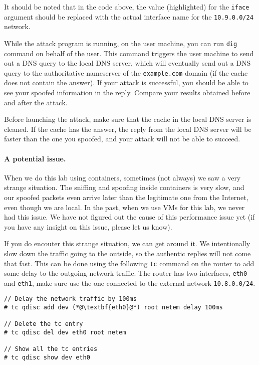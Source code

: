 It should be noted that in the code above, the value (highlighted) for the 
\texttt{iface} argument should be replaced with the actual interface 
name for the \texttt{10.9.0.0/24} network.  
 
While the attack program is running, on the user machine, you can
run \texttt{dig} command on behalf of the user.
This command triggers the user
machine to send out a DNS query to the local DNS server, which will
eventually send out a DNS query to the authoritative nameserver of the
\texttt{example.com} domain (if the cache does not contain the answer).
If your attack is successful, you should be able to see
your spoofed information in the reply. Compare your results obtained before
and after the attack. 

Before launching the attack, make sure that the cache in the local DNS
server is cleaned. If the cache has the answer, the reply from the 
local DNS server will be faster than the one you spoofed, and your 
attack will not be able to succeed. 





\paragraph{A potential issue.} When we do this lab using containers, 
sometimes (not always) we saw a very strange situation. The sniffing and spoofing 
inside containers is very slow, and our spoofed packets even arrive 
later than the legitimate one from the Internet, even though 
we are local. In the past, when we use VMs for this lab, we never 
had this issue. We have not figured out the cause of this 
performance issue yet (if you have any insight on this issue, please 
let us know). 

If you do encouter this strange situation, we can get 
around it. We intentionally slow down the 
traffic going to the outside, so the authentic replies will not 
come that fast. This can be done using the 
following \texttt{tc} command on the router to add some 
delay to the outgoing network traffic. 
The router has two interfaces, \texttt{eth0} and 
\texttt{eth1}, make sure use the one connected 
to the external network \texttt{10.8.0.0/24}.

\begin{lstlisting}
// Delay the network traffic by 100ms
# tc qdisc add dev (*@\textbf{eth0}@*) root netem delay 100ms

// Delete the tc entry
# tc qdisc del dev eth0 root netem

// Show all the tc entries 
# tc qdisc show dev eth0
\end{lstlisting}
 

